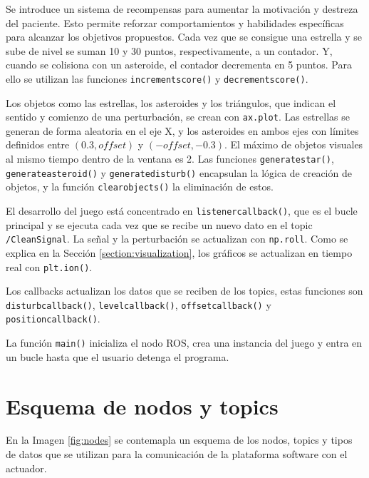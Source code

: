 Se introduce un sistema de recompensas para aumentar la motivación y destreza del paciente.
Esto permite reforzar comportamientos y habilidades específicas para alcanzar los objetivos propuestos.
Cada vez que se consigue una estrella y se sube de nivel se suman 10 y 30 puntos, respectivamente, a un contador.
Y, cuando se colisiona con un asteroide, el contador decrementa en 5 puntos.
Para ello se utilizan las funciones \verb|incrementscore()| y \verb|decrementscore()|.

Los objetos como las estrellas, los asteroides y los triángulos, que indican el sentido y comienzo de una perturbación, se crean con \verb|ax.plot|.
Las estrellas se generan de forma aleatoria en el eje X, y los asteroides en ambos ejes con límites definidos entre $(0.3, offset)$ y $(-offset, -0.3)$.
El máximo de objetos visuales al mismo tiempo dentro de la ventana es 2.
Las funciones \verb|generatestar()|, \verb|generateasteroid()| y \verb|generatedisturb()| encapsulan la lógica de creación de objetos, y la función \verb|clearobjects()| la eliminación de estos.

El desarrollo del juego está concentrado en \verb|listenercallback()|, que es el bucle principal y se ejecuta cada vez que se recibe un nuevo dato en el topic \verb|/CleanSignal|.
La señal y la perturbación se actualizan con \verb|np.roll|.
Como se explica en la Sección \ref{section:visualization}, los gráficos se actualizan en tiempo real con \verb|plt.ion()|.

Los callbacks actualizan los datos que se reciben de los topics, estas funciones son \verb|disturbcallback()|, \verb|levelcallback()|, \verb|offsetcallback()| y \verb|positioncallback()|.

La función \verb|main()| inicializa el nodo ROS, crea una instancia del juego y entra en un bucle hasta que el usuario detenga el programa.

\section{Esquema de nodos y topics}
\label{section:review}

En la Imagen \ref{fig:nodes} se contemapla un esquema de los nodos, topics y tipos de datos que se utilizan para la comunicación de la plataforma software con el actuador.


